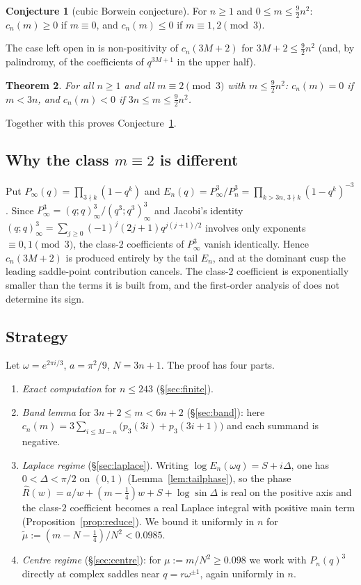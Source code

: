 \documentclass[11pt,reqno]{amsart}
\theoremstyle{plain}
\newtheorem{theorem}{Theorem}[section]
\theoremstyle{definition}
\newtheorem{conjecture}[theorem]{Conjecture}
\newcommand{\Rh}{\widehat{R}}
\begin{document}
\begin{conjecture}[cubic Borwein conjecture]\label{conj}
For $n\ge1$ and $0\le m\le\frac92n^2$: $c_n(m)\ge0$ if $m\equiv0$, and $c_n(m)\le0$ if $m\equiv1,2\pmod 3$.
\end{conjecture}

The case left open in \cite[\S11]{KW} is non-positivity of $c_n(3M+2)$ for $3M+2\le\frac92n^2$ (and, by palindromy, of the
coefficients of $q^{3M+1}$ in the upper half).

\begin{theorem}\label{thm:main}
For all $n\ge1$ and all $m\equiv2\pmod3$ with $m\le\frac92n^2$: $c_n(m)=0$ if $m<3n$, and $c_n(m)<0$ if $3n\le m\le\frac92n^2$.
\end{theorem}

Together with \cite{KW} this proves Conjecture~\ref{conj}.

\subsection{Why the class $m\equiv 2$ is different}
Put $P_\infty(q)=\prod_{3\nmid k}(1-q^k)$ and $E_n(q)=P_\infty^3/P_n^3=\prod_{k>3n,\,3\nmid k}(1-q^k)^{-3}$. Since
$P_\infty^3=(q;q)_\infty^3/(q^3;q^3)_\infty^3$ and Jacobi's identity $(q;q)_\infty^3=\sum_{j\ge0}(-1)^j(2j+1)q^{j(j+1)/2}$ involves
only exponents $\equiv0,1\pmod 3$, the class-$2$ coefficients of $P_\infty^3$ vanish identically. Hence $c_n(3M+2)$ is produced
entirely by the tail $E_n$, and at the dominant cusp the leading saddle-point contribution cancels. The class-$2$ coefficient is
exponentially smaller than the terms it is built from, and the first-order analysis of \cite{KW} does not determine its sign.

\subsection{Strategy}
Let $\omega=e^{2\pi i/3}$, $a=\pi^2/9$, $N=3n+1$. The proof has four parts.
\begin{enumerate}
\item \emph{Exact computation} for $n\le243$ (\S\ref{sec:finite}).
\item \emph{Band lemma} for $3n+2\le m<6n+2$ (\S\ref{sec:band}): here $c_n(m)=3\sum_{i\le M-n}\bigl(p_3(3i)+p_3(3i+1)\bigr)$ and each
summand is negative.
\item \emph{Laplace regime} (\S\ref{sec:laplace}). Writing $\log E_n(\omega q)=S+i\Delta$, one has $0<\Delta<\pi/2$ on $(0,1)$
(Lemma~\ref{lem:tailphase}), so the phase $\Rh(w)=a/w+(m-\frac14)w+S+\log\sin\Delta$ is real on the positive axis and the class-$2$
coefficient becomes a real Laplace integral with positive main term (Proposition~\ref{prop:reduce}). We bound it uniformly in $n$ for
$\tilde\mu:=(m-N-\frac14)/N^2<0.0985$.
\item \emph{Centre regime} (\S\ref{sec:centre}): for $\mu:=m/N^2\ge0.098$ we work with $P_n(q)^3$ directly at complex saddles near
$q=r\omega^{\pm1}$, again uniformly in $n$.
\end{enumerate}
\end{document}
